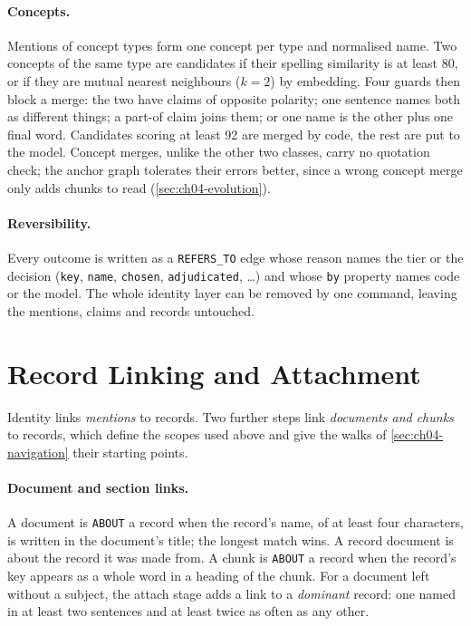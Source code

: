 \paragraph{Concepts.} Mentions of concept types form one concept per type and normalised name. Two concepts of
the same type are candidates if their spelling similarity is at least 80, or if they are mutual nearest neighbours
($k = 2$) by embedding. Four guards then block a merge: the two have claims of opposite polarity; one sentence
names both as different things; a part-of claim joins them; or one name is the other plus one final word.
Candidates scoring at least 92 are merged by code, the rest are put to the model. Concept merges, unlike the other
two classes, carry no quotation check; the anchor graph tolerates their errors better, since a wrong concept
merge only adds chunks to read (\cref{sec:ch04-evolution}).

\paragraph{Reversibility.} Every outcome is written as a \texttt{REFERS\_TO} edge whose reason names the tier or
the decision (\texttt{key}, \texttt{name}, \texttt{chosen}, \texttt{adjudicated}, \dots) and whose \texttt{by}
property names code or the model. The whole identity layer can be removed by one command, leaving the mentions,
claims and records untouched.

\section{Record Linking and Attachment}\label{sec:ch04-linking}

Identity links \emph{mentions} to records. Two further steps link \emph{documents and chunks} to records, which
define the scopes used above and give the walks of \cref{sec:ch04-navigation} their starting points.

\paragraph{Document and section links.} A document is \texttt{ABOUT} a record when the record's name, of at least
four characters, is written in the document's title; the longest match wins. A record document is about the record
it was made from. A chunk is \texttt{ABOUT} a record when the record's key appears as a whole word in a heading of
the chunk. For a document left without a subject, the attach stage adds a link to a \emph{dominant} record: one
named in at least two sentences and at least twice as often as any other.

